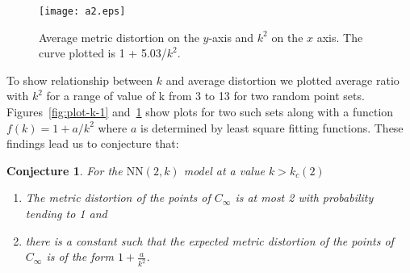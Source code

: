 \documentclass[11pt]{article}
\newtheorem{conjecture}[theorem]{Conjecture}
\def\NN{\mbox{NN}}
\begin{document}
\begin{figure}
  \begin{center}
    \texttt{[image: a2.eps]}
  \end{center}
\label{fig:plot-k-2}
\caption{Average metric distortion on the $y$-axis and $k^2$ on the
  $x$ axis. The curve plotted is 1 + 5.03/$k^2$.}
\end{figure}


To show relationship between $k$ and average distortion we plotted
average ratio with $k^2$ for a range of value of k from 3 to 13 for
two random point sets. Figures~\ref{fig:plot-k-1}
and~\ref{fig:plot-k-2} show plots for two such sets along with a
function $f(k) = 1 + a/k^2$ where $a$ is determined by least square
fitting functions. These findings lead us to conjecture that:

\begin{conjecture}
For the $\NN(2,k)$ model at a value $k > k_c(2)$
\begin{enumerate}
\item The metric distortion of the points of $C_\infty$ is at most 2
  with probability tending to 1 and 
\item there is a constant such that the expected metric distortion of
  the points of $C_\infty$ is of the form $1 + \frac{a}{k^2}$.
\end{enumerate}
\end{conjecture}
\end{document}
